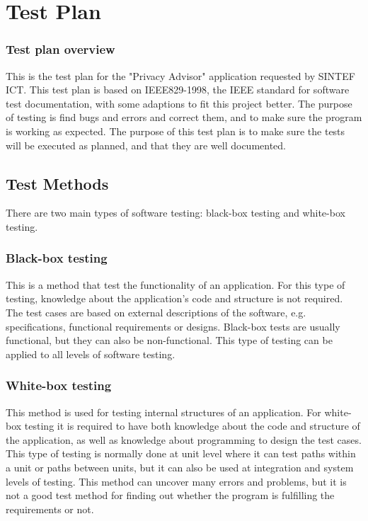 \chapter{Test Plan}

\minitoc

\subsection*{Test plan overview}
This is the test plan for the "Privacy Advisor" application requested by SINTEF ICT. This test plan is based on IEEE829-1998, the IEEE standard for software test documentation, with some adaptions to fit this project better. The purpose of testing is find bugs and errors and correct them, and to make sure the program is working as expected. The purpose of this test plan is to make sure the tests will be executed as planned, and that they are well documented.

\setcounter{tocdepth}{1}

\section{Test Methods}
There are two main types of software testing: black-box testing and white-box testing.
		
\subsection{Black-box testing}
This is a method that test the functionality of an application. For this type of testing, knowledge about the application's code and structure is not required. The test cases are based on external descriptions of the software, e.g. specifications, functional requirements or designs. Black-box tests are usually functional, but they can also be non-functional. This type of testing can be applied to all levels of software testing.
		
\subsection{White-box testing}
This method is used for testing internal structures of an application. For white-box testing it is required to have both knowledge about the code and structure of the application, as well as knowledge about programming to design the test cases. This type of testing is normally 	done at unit level where it can test paths within a unit or paths between units, but it can also be used at integration and system levels of testing. This method can uncover many errors and problems, but it is not a good test method for finding out whether the program is fulfilling the requirements or not.


